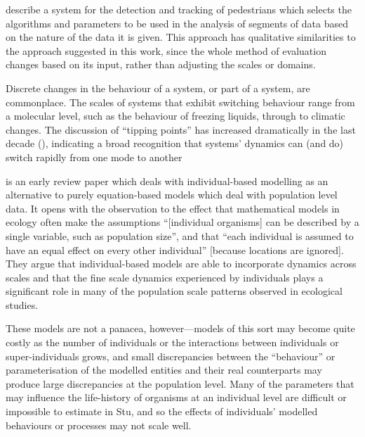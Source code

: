 \cite{DBLP:ZhangZR16} describe a system for the
detection and tracking of pedestrians which selects the algorithms and
parameters to be used in the analysis of segments of data based on the
nature of the data it is given. This approach has qualitative
similarities to the approach suggested in this work, since the whole
method of evaluation changes based on its input, rather than 
adjusting the scales or domains.

Discrete changes in the behaviour of a system, or part of a system,
are commonplace. The scales of systems that exhibit switching
behaviour range from a molecular level, such as the behaviour of
freezing liquids, through to climatic changes.  The discussion of
``tipping points'' has increased dramatically in the last decade
(\citep{bhatanacharoentipping}), indicating a broad recognition that
systems' dynamics can (and do) switch rapidly from one mode to another

\cite{huston1988new} is an early review paper which deals with
individual-based modelling as an alternative to purely equation-based
models which deal with population level data.  It opens with the
observation to the effect that mathematical models in ecology often
make the assumptions ``[individual organisms] can be described by a
single variable, such as population size'', and that ``each individual
is assumed to have an equal effect on every other individual''
[because locations are ignored]. They argue that individual-based
models are able to incorporate dynamics across scales and that the
fine scale dynamics experienced by individuals plays a significant
role in many of the population scale patterns observed in ecological
studies. 

These models are not a panacea, however---models of this sort may
become quite costly as the number of individuals or the interactions
between individuals or super-individuals grows, and small
discrepancies between the ``behaviour'' or parameterisation of the
modelled entities and their real counterparts may produce large
discrepancies at the population level. Many of the parameters that may
influence the life-history of organisms  at an individual level are
difficult or impossible to estimate in Stu, and so the effects of
individuals' modelled behaviours or processes may not scale well.

